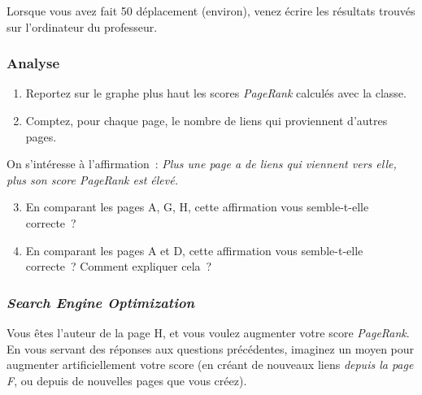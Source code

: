 \documentclass[11pt]{article}
\begin{document}

Lorsque vous avez fait 50 déplacement (environ),  venez écrire les résultats trouvés sur l'ordinateur du professeur.

\subsubsection*{Analyse}

\begin{enumerate}
  \item Reportez sur le graphe plus haut les scores \emph{PageRank} calculés avec la classe.
      \item Comptez, pour chaque page, le nombre de liens qui proviennent d'autres pages.
    \end{enumerate}
    On s'intéresse à l'affirmation :
    \emph{\og Plus une page a de liens qui viennent \emph{vers} elle, plus son score \emph{PageRank} est élevé.\fg}
    \begin{enumerate}
        \setcounter{enumi}{2}
      \item En comparant les pages A, G, H, cette affirmation vous semble-t-elle correcte ?
      \item En comparant les pages A et D, cette affirmation vous semble-t-elle correcte ? Comment expliquer cela ?
\end{enumerate}

\subsubsection*{\emph{Search Engine Optimization}}

Vous êtes l'auteur de la page H, et vous voulez augmenter votre score \emph{PageRank}. En vous servant des réponses aux questions précédentes, imaginez un moyen pour augmenter artificiellement votre score (en créant de nouveaux liens \emph{depuis la page F}, ou depuis de nouvelles pages que vous créez).
\end{document}
